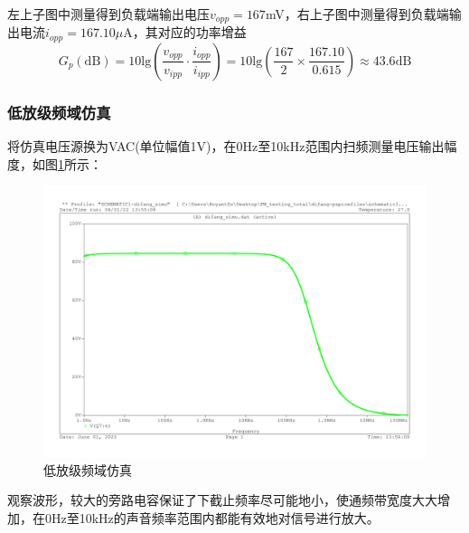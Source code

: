 \documentclass[a4paper,12pt,twoside]{article}
\begin{document}
左上子图中测量得到负载端输出电压$v_{opp}=167$mV，右上子图中测量得到负载端输出电流$i_{opp}=167.10\mu$A，其对应的功率增益
\begin{equation}
    G_{p}(\mathrm{dB})=10\mathrm{lg}(\frac{v_{opp}}{v_{ipp}}\cdot \frac{i_{opp}}{i_{ipp}})=10\mathrm{lg}(\frac{167}{2}\times\frac{167.10}{0.615})\approx43.6\mathrm{dB}
    \label{式29}
\end{equation}

\subsubsection{低放级频域仿真}
将仿真电压源换为VAC(单位幅值1V)，在0Hz至10kHz范围内扫频测量电压输出幅度，如图\ref{低放扫频}所示：
\begin{figure}[H]
    \centering
    \includegraphics[scale=0.3]{低放频域仿真.pdf}
    \caption{低放级频域仿真}
    \label{低放扫频}
\end{figure}

观察波形，较大的旁路电容保证了下截止频率尽可能地小，使通频带宽度大大增加，在0Hz至10kHz的声音频率范围内都能有效地对信号进行放大。
\end{document}

